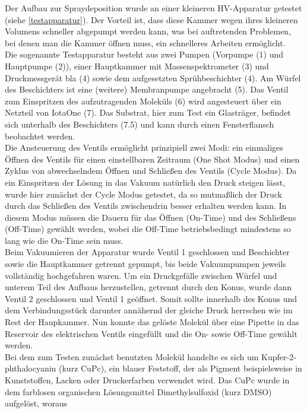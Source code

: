 Der Aufbau zur Spraydeposition wurde an einer kleineren HV-Apparatur getestet (siehe \ref{testapparatur}). Der
Vorteil ist, dass diese Kammer wegen ihres kleineren Volumens schneller abgepumpt werden kann, was bei
auftretenden Problemen, bei denen man die Kammer öffnen muss, ein schnelleres Arbeiten ermöglicht.\\
Die sogenannte Testapparatur besteht aus zwei Pumpen (Vorpumpe (1) und Hauptpumpe (2)),
einer Hauptkammer mit Massenspektrometer (3) und Druckmessgerät bla (4) sowie dem aufgesetzten
Sprühbeschichter (4). Am Würfel des Beschichters ist eine (weitere) Membranpumpe angebracht (5). Das Ventil
zum Einspritzen des aufzutragenden Moleküls (6) wird angesteuert über ein Netzteil von IotaOne (7). Das
Substrat, hier zum Test ein Glasträger, befindet sich unterhalb des Beschichters (7.5) und kann durch einen
Fensterflansch beobachtet werden.\\
Die Ansteuerung des Ventils ermöglicht
prinzipiell zwei Modi: ein einmaliges Öffnen des
Ventils für einen einstellbaren Zeitraum (One
Shot Modus) und einen Zyklus von abwechselndem
Öffnen und Schließen des Ventils (Cycle Modus).
Da ein Einspritzen der Lösung in das Vakuum
natürlich den Druck steigen lässt, wurde hier
zunächst der Cycle Modus getestet, da so
mutmaßlich der Druck durch das Schließen des
Ventils zwischendrin besser erhalten werden
kann. In diesem Modus müssen die Dauern für das
Öffnen (On-Time) und des Schließens (Off-Time)
gewählt werden, wobei die Off-Time
betriebsbedingt mindestens so lang wie die
On-Time sein muss.\\
Beim Vakuumieren der Apparatur wurde Ventil 1
 geschlossen und Beschichter sowie die 
 Hauptkammer getrennt gepumpt, bis beide
 Vakuumpumpen jeweils vollständig hochgefahren
 waren.
 Um ein Druckgefälle zwischen Würfel und unterem
 Teil des Aufbaus herzustellen, getrennt durch den
 Konus, wurde dann Ventil 2 geschlossen und
 Ventil 1 geöffnet.
 Somit sollte innerhalb des Konus und dem
 Verbindungsstück darunter annähernd der gleiche
 Druck herrschen wie im Rest der Haupkammer.
 Nun konnte das gelöste Molekül über eine Pipette
 in das Reservoir des elektrischen Ventils
 eingefüllt und die On- sowie Off-Time gewählt
 werden.\\
Bei dem zum Testen zunächst benutzten Molekül
handelte es sich um Kupfer-2-phthalocyanin (kurz
CuPc), ein blauer Feststoff, der als Pigment
beispielsweise in Kunststoffen, Lacken oder
Druckerfarben verwendet wird. Das CuPc wurde in
dem farblosen organischen Lösungsmittel
Dimethylsulfoxid (kurz DMSO) aufgelöst, woraus
